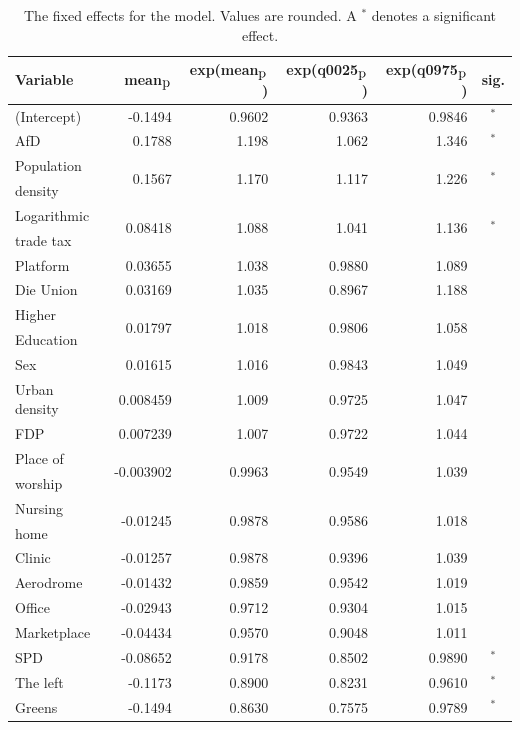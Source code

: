 \begin{table}[H]
\caption{The fixed effects for the model. Values are rounded. A $^*$ denotes a significant effect. \label{FixedAllGermany_nospatial}}
\begin{tabular}{l r r r r c}
\toprule
\textbf{Variable}	& \textbf{mean$_{\hbox{p}}$}	& \textbf{exp(mean$_{\hbox{p}}$)} & \textbf{exp(q0025$_{\hbox{p}}$)} & \textbf{exp(q0975$_{\hbox{p}}$)} & \textbf{sig.}\\
\midrule
(Intercept) & -0.1494 & 0.9602 & 0.9363 & 0.9846 & $^*$\\
AfD & 0.1788 & 1.198 & 1.062 & 1.346 & $^*$\\
Population & \multirow{2}{*}{0.1567} & \multirow{2}{*}{1.170} & \multirow{2}{*}{1.117} & \multirow{2}{*}{1.226} & \multirow{2}{*}{$^*$}\\
density \\
Logarithmic & \multirow{2}{*}{0.08418} & \multirow{2}{*}{1.088} & \multirow{2}{*}{1.041} & \multirow{2}{*}{1.136} & \multirow{2}{*}{$^*$}\\
trade tax \\
Platform & 0.03655 & 1.038 & 0.9880 & 1.089 \\
Die Union & 0.03169 & 1.035 & 0.8967 & 1.188\\
Higher & \multirow{2}{*}{0.01797} & \multirow{2}{*}{1.018} & \multirow{2}{*}{0.9806} & \multirow{2}{*}{1.058} \\
Education\\
Sex & 0.01615 & 1.016 & 0.9843 & 1.049 & \\
Urban density & 0.008459 & 1.009 & 0.9725 & 1.047 \\
FDP & 0.007239 & 1.007 & 0.9722 & 1.044 \\
Place of & \multirow{2}{*}{-0.003902} & \multirow{2}{*}{0.9963} & \multirow{2}{*}{0.9549} & \multirow{2}{*}{1.039} \\
worship\\
Nursing & \multirow{2}{*}{-0.01245} & \multirow{2}{*}{0.9878} & \multirow{2}{*}{0.9586} & \multirow{2}{*}{1.018} \\
home\\
Clinic & -0.01257 & 0.9878 & 0.9396 & 1.039 \\
Aerodrome & -0.01432 & 0.9859 & 0.9542 & 1.019 \\
Office & -0.02943 & 0.9712 & 0.9304 & 1.015 \\
Marketplace & -0.04434 & 0.9570 & 0.9048 & 1.011 \\
SPD & -0.08652 & 0.9178 & 0.8502 & 0.9890 & $^*$\\
The left & -0.1173 & 0.8900 & 0.8231 & 0.9610 & $^*$\\
Greens & -0.1494 & 0.8630 & 0.7575 & 0.9789 & $^*$\\
\bottomrule
\end{tabular}
\end{table}
